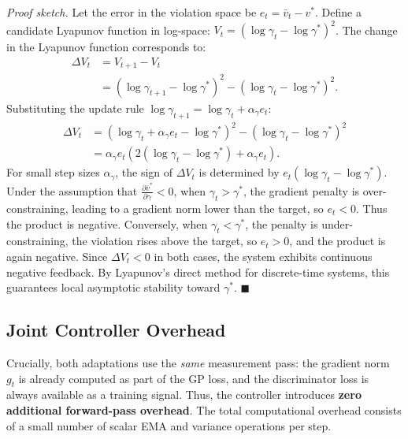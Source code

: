 \documentclass[journal]{IEEEtran}
\newcommand{\vtarget}{v^{*}}
\begin{document}
\emph{Proof sketch.} Let the error in the violation space be $e_t = \bar{v}_t - \vtarget$.
Define a candidate Lyapunov function in log-space: $V_t = (\log \gamma_t - \log \gamma^*)^2$. The change in the Lyapunov function corresponds to:
\begin{align*}
\Delta V_t &= V_{t+1} - V_t \\
&= (\log \gamma_{t+1} - \log \gamma^*)^2 - (\log \gamma_t - \log \gamma^*)^2.
\end{align*}
Substituting the update rule $\log \gamma_{t+1} = \log \gamma_t + \alpha_\gamma e_t$:
\begin{align*}
\Delta V_t &= (\log \gamma_t + \alpha_\gamma e_t - \log \gamma^*)^2 - (\log \gamma_t - \log \gamma^*)^2 \\
&= \alpha_\gamma e_t \left( 2(\log \gamma_t - \log \gamma^*) + \alpha_\gamma e_t \right).
\end{align*}
For small step sizes $\alpha_\gamma$, the sign of $\Delta V_t$ is determined by $e_t (\log \gamma_t - \log \gamma^*)$.
Under the assumption that $\frac{\partial \bar{v}^*}{\partial \gamma} < 0$, when $\gamma_t > \gamma^*$, the gradient penalty is over-constraining, leading to a gradient norm lower than the target, so $e_t < 0$. Thus the product is negative. Conversely, when $\gamma_t < \gamma^*$, the penalty is under-constraining, the violation rises above the target, so $e_t > 0$, and the product is again negative. Since $\Delta V_t < 0$ in both cases, the system exhibits continuous negative feedback. By Lyapunov's direct method for discrete-time systems, this guarantees local asymptotic stability toward $\gamma^*$. \hfill $\blacksquare$

\subsection{Joint Controller Overhead}

Crucially, both adaptations use the \emph{same} measurement pass: the gradient norm~$g_t$ is already computed as part of the GP loss, and the discriminator loss is always available as a training signal. Thus, the controller introduces \textbf{zero additional forward-pass overhead}. The total computational overhead consists of a small number of scalar EMA and variance operations per step.
\end{document}
